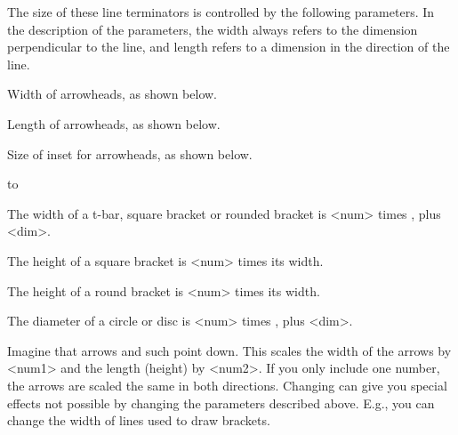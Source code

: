 The size of these line terminators is controlled by the following parameters.
In the description of the parameters, the width always refers to the dimension
perpendicular to the line, and length refers to a dimension in the direction
of the line.
\begin{description}

\pitem[arrowsize=dim num]
  Width of arrowheads, as shown below.

\pitem[arrowlength=num]
  Length of arrowheads, as shown below.

\pitem[arrowinset=num]
  Size of inset for arrowheads, as shown below.

\begin{center}\leavevmode
\hbox to 
\end{center}

\pitem[tbarsize=dim num]
  The width of a t-bar, square bracket or rounded bracket is <num> times
, plus <dim>.

\pitem[bracketlength=num]
  The height of a square bracket is <num> times its width.

\pitem[rbracketlength=num]
  The height of a round bracket is <num> times its width.

\pitem[dotsize=dim num]
  The diameter of a circle or disc is <num> times , plus <dim>.

\pitem[arrowscale=arrowscale=num1 <num2>]
  Imagine that arrows and such point down. This scales the width of the arrows
by <num1> and the length (height) by <num2>. If you only include one number,
the arrows are scaled the same in both directions. Changing  can
give you special effects not possible by changing the parameters described
above. E.g., you can change the width of lines used to draw brackets.
\end{description}


